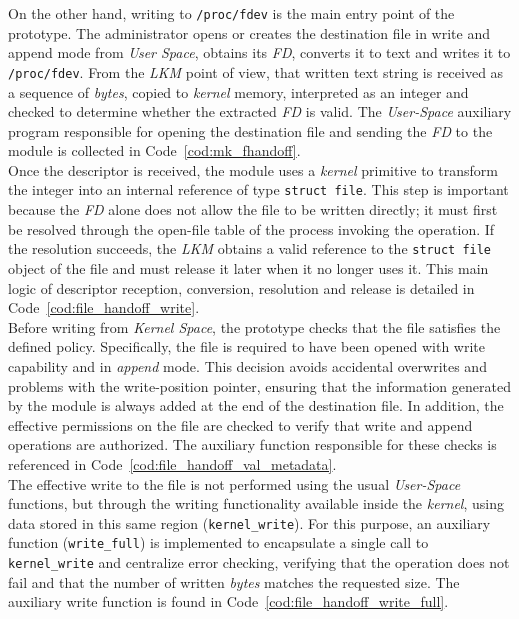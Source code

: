 On the other hand, writing to \texttt{/proc/fdev} is the main entry point of the prototype.
The administrator opens or creates the destination file in write and append mode from \textit{User Space}, obtains its \textit{FD}, converts it to text and writes it to \texttt{/proc/fdev}.
From the \textit{LKM} point of view, that written text string is received as a sequence of \textit{bytes}, copied to \textit{kernel} memory, interpreted as an integer and checked to determine whether the extracted \textit{FD} is valid.
The \textit{User-Space} auxiliary program responsible for opening the destination file and sending the \textit{FD} to the module is collected in Code~\ref{cod:mk_fhandoff}.\\

Once the descriptor is received, the module uses a \textit{kernel} primitive to transform the integer into an internal reference of type \texttt{struct file}.
This step is important because the \textit{FD} alone does not allow the file to be written directly; it must first be resolved through the open-file table of the process invoking the operation.
If the resolution succeeds, the \textit{LKM} obtains a valid reference to the \texttt{struct file} object of the file and must release it later when it no longer uses it.
This main logic of descriptor reception, conversion, resolution and release is detailed in Code~\ref{cod:file_handoff_write}.\\

Before writing from \textit{Kernel Space}, the prototype checks that the file satisfies the defined policy.
Specifically, the file is required to have been opened with write capability and in \textit{append} mode.
This decision avoids accidental overwrites and problems with the write-position pointer, ensuring that the information generated by the module is always added at the end of the destination file.
In addition, the effective permissions on the file are checked to verify that write and append operations are authorized.
The auxiliary function responsible for these checks is referenced in Code~\ref{cod:file_handoff_val_metadata}.\\

The effective write to the file is not performed using the usual \textit{User-Space} functions, but through the writing functionality available inside the \textit{kernel}, using data stored in this same region (\verb|kernel_write|).
For this purpose, an auxiliary function (\verb|write_full|) is implemented to encapsulate a single call to \verb|kernel_write| and centralize error checking, verifying that the operation does not fail and that the number of written \textit{bytes} matches the requested size.
The auxiliary write function is found in Code~\ref{cod:file_handoff_write_full}.\\

